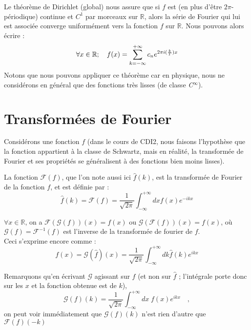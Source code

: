 \documentclass[../notesdecours.tex]{subfiles}
\begin{document}
\begin{theorem}
    Le théorème de Dirichlet (global) nous assure que si $f$ est (en plus d'être $2\pi$-périodique) continue et $C^1$ par morceaux sur $\mathbb{R}$, alors la série de Fourier qui lui est associée converge uniformément 
    vers la fonction $f$ sur $\mathbb{R}$. Nous pouvons alors écrire :  
\begin{equation}
    \forall x \in \mathbb{R} ; \quad f(x) = \sum_{k = -\infty}^{+\infty}c_ne^{2\pi i (\frac{k}{T})x} \\
\end{equation}
Notons que nous pouvons appliquer ce théorème car en physique, nous ne considérons en général que des fonctions très lisses (de classe \textit{C}$^{\infty}$).
\end{theorem}



\section{Transformées de Fourier}

Considérons une fonction $f$ (dans le cours de CDI2, nous faisons l'hypothèse que la fonction 
appartient à la classe de Schwartz, mais en réalité, la transformée de Fourier et ses propriétés se généralisent 
à des fonctions bien moins lisses). \\

\begin{definition}
    La fonction  $\mathcal{F}(f)$, que l'on note aussi ici $\hat{f}(k)$, est la transformée 
    de Fourier de la fonction $f$, et est définie par : 
\begin{equation}
\hat{f}(k) = \mathcal{F}(f) = \frac{1}{\sqrt{2 \pi}} \int_{-\infty}^{+\infty} dx f(x) e^{-ikx}
\end{equation}
\end{definition}

\begin{theorem} 
    $\forall x \in \mathbb{R}$, on a $\mathcal{F}(\mathcal{G}(f))(x) = f(x)$ ou $\mathcal{G}(\mathcal{F}(f))(x) = f(x)$, 
    où $\mathcal{G}(f) = \mathcal{F}^{-1}(f)$ est l'inverse de la transformée de fourier de $f$. \\
    
    Ceci s'exprime encore comme : 
    \begin{equation}
        f(x) = \mathcal{G}(\hat{f})(x) = \frac{1}{\sqrt{2 \pi}} \int_{-\infty}^{+\infty} dk\hat{f}(k) e^{ikx}
    \end{equation}

    Remarquons qu'en écrivant $\mathcal{G}$ agissant sur $f$ (et non sur $\hat f$ ; l'intégrale porte donc sur les $x$ et la fonction obtenue est de $k$),
    $$\mathcal{G}(f)(k) = \dfrac{1}{\sqrt{2\pi}} \int_{-\infty}^{+\infty} dx \; f(x) e ^{ikx} \quad ,$$
    on peut voir immédiatement que $\mathcal{G}(f)(k)$ n'est rien d'autre que $\mathcal{F}(f)(-k)$
\end{theorem}
\end{document}
